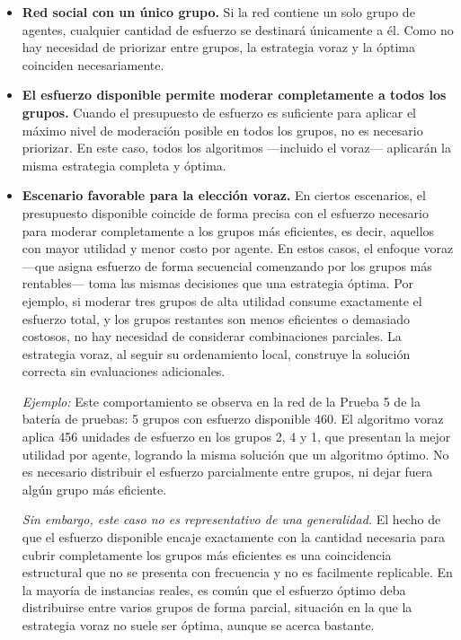 \documentclass[11pt,letter]{article}
\begin{document}
    \begin{itemize}
        \item \textbf{Red social con un único grupo.}
        Si la red contiene un solo grupo de agentes, cualquier cantidad de esfuerzo se destinará únicamente a él. Como no hay necesidad de priorizar entre grupos, la estrategia voraz y la óptima coinciden necesariamente.


        \item \textbf{El esfuerzo disponible permite moderar completamente a todos los grupos.}
        Cuando el presupuesto de esfuerzo es suficiente para aplicar el máximo nivel de moderación posible en todos los grupos, no es necesario priorizar. En este caso, todos los algoritmos —incluido el voraz— aplicarán la misma estrategia completa y óptima.

    \item \textbf{Escenario favorable para la elección voraz.}
En ciertos escenarios, el presupuesto disponible coincide de forma precisa con el esfuerzo necesario para moderar completamente a los grupos más eficientes, es decir, aquellos con mayor utilidad y menor costo por agente. En estos casos, el enfoque voraz —que asigna esfuerzo de forma secuencial comenzando por los grupos más rentables— toma las mismas decisiones que una estrategia óptima. Por ejemplo, si moderar tres grupos de alta utilidad consume exactamente el esfuerzo total, y los grupos restantes son menos eficientes o demasiado costosos, no hay necesidad de considerar combinaciones parciales. La estrategia voraz, al seguir su ordenamiento local, construye la solución correcta sin evaluaciones adicionales.

\textit{Ejemplo:} Este comportamiento se observa en la red de la Prueba 5 de la batería de pruebas: 5 grupos con esfuerzo disponible 460. El algoritmo voraz aplica 456 unidades de esfuerzo en los grupos 2, 4 y 1, que presentan la mejor utilidad por agente, logrando la misma solución que un algoritmo óptimo. No es necesario distribuir el esfuerzo parcialmente entre grupos, ni dejar fuera algún grupo más eficiente.

\textit{Sin embargo, este caso no es representativo de una generalidad.} El hecho de que el esfuerzo disponible encaje exactamente con la cantidad necesaria para cubrir completamente los grupos más eficientes es una coincidencia estructural que no se presenta con frecuencia y no es facilmente replicable. En la mayoría de instancias reales, es común que el esfuerzo óptimo deba distribuirse entre varios grupos de forma parcial, situación en la que la estrategia voraz no suele ser óptima, aunque se acerca bastante.

    \end{itemize}
\end{document}
